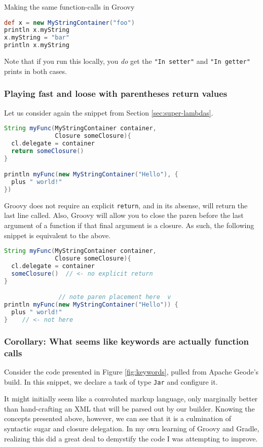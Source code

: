 \documentclass[]{article}
\theoremstyle{definition}
\begin{document}
Making the same function-calls in Groovy
\begin{lstlisting}[language=Groovy]
def x = new MyStringContainer("foo")
println x.myString
x.myString = "bar"
println x.myString
\end{lstlisting}

Note that if you run this locally, you \emph{do} get
  the \texttt{"In setter"} and \texttt{"In getter"} prints in both cases.

\subsubsection{Playing fast and loose with parentheses return values}

Let us consider again the snippet from Section \ref{sec:super-lambdas}.

\begin{lstlisting}[language=Groovy]
String myFunc(MyStringContainer container,
              Closure someClosure){
  cl.delegate = container
  return someClosure()
}

println myFunc(new MyStringContainer("Hello"), {
  plus " world!"
})
\end{lstlisting}

Groovy does not require an explicit \texttt{return}, and in its absense, will return the last
  line called.
Also, Groovy will allow you to close the paren before the last argument of a function if that
  final argument is a closure.
As such, the following snippet is equivalent to the above.

\begin{lstlisting}[language=Groovy]
String myFunc(MyStringContainer container,
              Closure someClosure){
  cl.delegate = container
  someClosure()  // <- no explicit return
}

               // note paren placement here  v
println myFunc(new MyStringContainer("Hello")) {
  plus " world!"
}    // <- not here
\end{lstlisting}

\subsubsection{Corollary: What seems like keywords are actually function calls}

Consider the code presented in Figure \ref{fig:keywords}, pulled from Apache Geode's build.
In this snippet, we declare a task of type \texttt{Jar} and configure it.

It might initially seem like a convoluted markup language,
  only marginally better than hand-crafting an XML that will be parsed out by our builder.
Knowing the concepts presented above, however, we can see that it is a culmination of
  syntactic sugar and closure delegation.
In my own learning of Groovy and Gradle, realizing this did a great deal to demystify the
  code I was attempting to improve.
\end{document}
